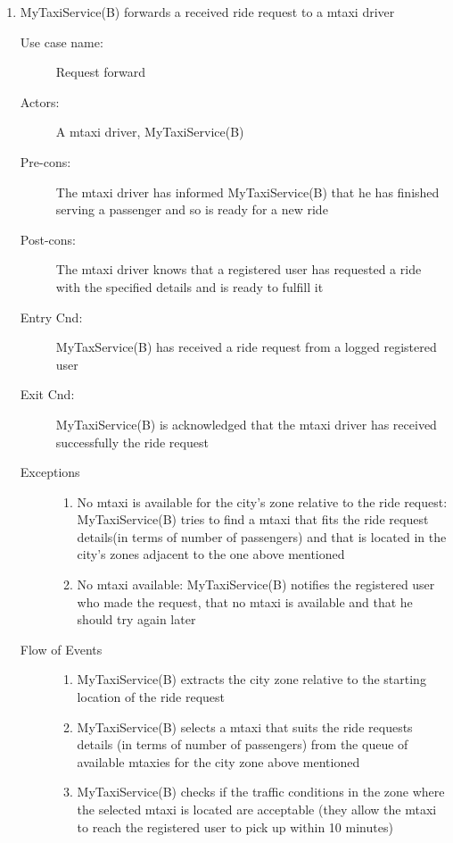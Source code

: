 \documentclass[11pt]{article} %
\begin{document}
\begin{enumerate}
	      \item  MyTaxiService(B) forwards a received ride request to a mtaxi driver
		\begin{description}
		        \item [Use case name:] Request forward
		        \item [Actors:] A mtaxi driver, MyTaxiService(B)
		        \item [Pre-cons:] The mtaxi driver has informed MyTaxiService(B) that he has finished serving a passenger and so is
		        ready for a new ride
		        \item [Post-cons:] The mtaxi driver knows that a registered user has requested a ride with the specified
		        details and is ready to fulfill it
		        \item [Entry Cnd:] MyTaxService(B) has received a ride request from a logged registered user
		        \item [Exit Cnd:] MyTaxiService(B) is acknowledged that the mtaxi driver has received successfully the ride request
		        \item [Exceptions]\hfill
			\begin{enumerate}
			          \item No mtaxi is available for the city's zone relative to the ride request: MyTaxiService(B) tries
			          to find a mtaxi that fits the ride request details(in terms of number of passengers) and that is located in the city's zones adjacent
			          to the one above mentioned
			          \item No mtaxi available: MyTaxiService(B) notifies the registered user who made the request, that
			          no mtaxi is available and that he should try again later
			\end{enumerate}
		        \item [Flow of Events]\hfill
			\begin{enumerate}
			          \item MyTaxiService(B) extracts the city zone relative to the starting location of the ride request
			          \item MyTaxiService(B) selects a mtaxi that suits the ride requests details (in terms of number of passengers) from the queue of available mtaxies
			            for the city zone above mentioned
			          \item MyTaxiService(B) checks if the traffic conditions in the zone where the selected mtaxi is located are acceptable
			          (they allow the mtaxi to reach the registered user to pick up within 10 minutes)

\end{enumerate}
\end{description}
\end{enumerate}
\end{document}
